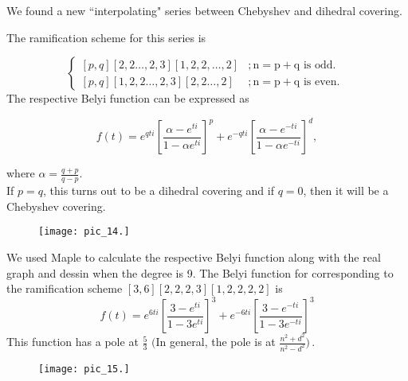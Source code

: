 \begin{example}We found a new ``interpolating" series between Chebyshev and dihedral covering. 


The ramification scheme for this series is

$$
\begin{cases}{[p, q][2,2 \ldots, 2,3][1,2,2, \ldots, 2]} & ; \mathrm{n}=\mathrm{p}+\mathrm{q} \text { is odd. } \\ {[p, q][1,2,2 \ldots, 2,3][2,2 \ldots, 2]} & ; \mathrm{n}=\mathrm{p}+\mathrm{q} \text { is even. }\end{cases}
$$
The respective Belyi function can be expressed as

$$
f(t)=e^{q t i}\left[\frac{\alpha-e^{t i}}{1-\alpha e^{t i}}\right]^{p}+e^{-q t i}\left[\frac{\alpha-e^{-t i}}{1-\alpha e^{-t i}}\right]^{d},
$$

where $\alpha=\frac{q+p}{q-p}$.\\

If $p=q$, this turns out to be a dihedral covering and if $q=0$, then it will be a Chebyshev covering.

\begin{figure}[htp]
\texttt{[image: pic\_14.]}
\end{figure}
\end{example}

We used Maple to calculate the respective Belyi function along with the real graph and dessin when the degree is 9. The Belyi function for corresponding to the ramification scheme $[3,6][2,2,2,3][1,2,2,2,2]$ is
$$
f(t)=e^{6 t i}\left[\frac{3-e^{t i}}{1-3 e^{t i}}\right]^{3}+e^{-6 t i}\left[\frac{3-e^{-t i}}{1-3 e^{-t i}}\right]^{3}
$$
This function has a pole at $\frac{5}{3}$ $\Bigg($In general, the pole is at $\frac{n^{2}+d^{2}}{n^{2}-d^{2}}\Bigg)\,.$


\begin{figure}[htp]
\texttt{[image: pic\_15.]}
\end{figure}  
\newpage


